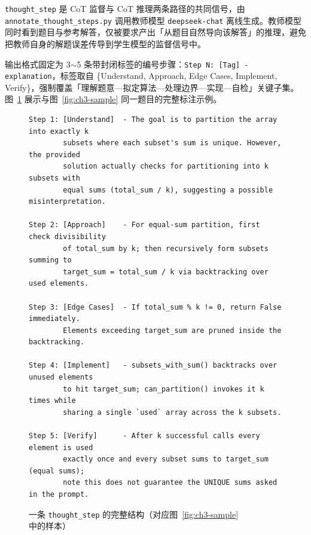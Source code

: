 
\texttt{thought\_step} 是 CoT 监督与 CoT 推理两条路径的共同信号，由 \texttt{annotate\_thought\_steps.py} 调用教师模型 \texttt{deepseek-chat} 离线生成。教师模型同时看到题目与参考解答，仅被要求产出「从题目自然导向该解答」的推理，避免把教师自身的解题误差传导到学生模型的监督信号中。

输出格式固定为 3$\sim$5 条带封闭标签的编号步骤：\texttt{Step N: [Tag] - explanation}，标签取自 \{Understand, Approach, Edge Cases, Implement, Verify\}，强制覆盖「理解题意—拟定算法—处理边界—实现—自检」关键子集。图~\ref{fig:ch3-thought-example} 展示与图~\ref{fig:ch3-sample} 同一题目的完整标注示例。

\begin{figure}[!htb]
\begin{footnotesize}
\begin{verbatim}
Step 1: [Understand]  - The goal is to partition the array into exactly k
        subsets where each subset's sum is unique. However, the provided
        solution actually checks for partitioning into k subsets with
        equal sums (total_sum / k), suggesting a possible misinterpretation.

Step 2: [Approach]    - For equal-sum partition, first check divisibility
        of total_sum by k; then recursively form subsets summing to
        target_sum = total_sum / k via backtracking over used elements.

Step 3: [Edge Cases]  - If total_sum % k != 0, return False immediately.
        Elements exceeding target_sum are pruned inside the backtracking.

Step 4: [Implement]   - subsets_with_sum() backtracks over unused elements
        to hit target_sum; can_partition() invokes it k times while
        sharing a single `used` array across the k subsets.

Step 5: [Verify]      - After k successful calls every element is used
        exactly once and every subset sums to target_sum (equal sums);
        note this does not guarantee the UNIQUE sums asked in the prompt.
\end{verbatim}
\end{footnotesize}
\vspace{-2mm}
\caption{一条 \texttt{thought\_step} 的完整结构（对应图~\ref{fig:ch3-sample} 中的样本）}
\label{fig:ch3-thought-example}
\end{figure}
